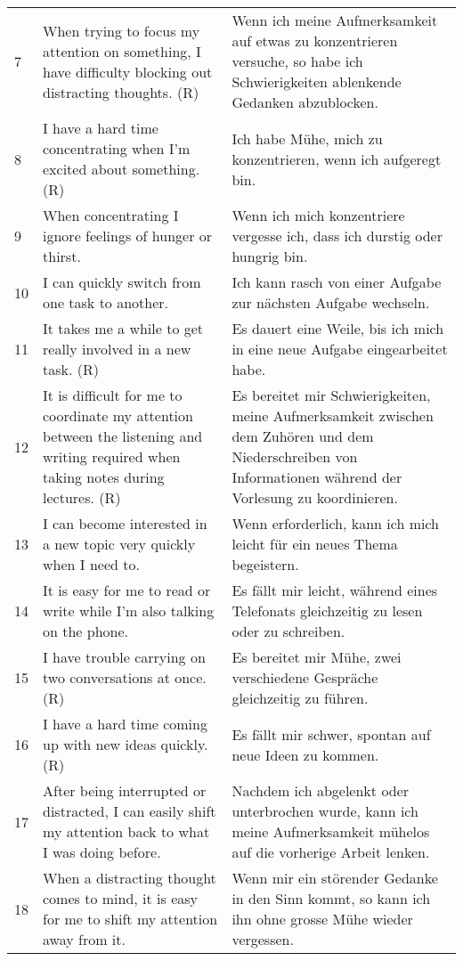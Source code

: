 \begin{RaggedRight}
\begin{center}
\begin{longtable}[t]{|l|p{6.6 cm}|p{6.6 cm}|}
        7 & When trying to focus my attention on something, I have difficulty blocking out distracting thoughts. (R) & Wenn ich meine Aufmerksamkeit auf etwas zu konzentrieren versuche, so habe ich Schwierigkeiten ablenkende Gedanken abzublocken. \\
        8 & I have a hard time concentrating when I’m excited about something. (R) & Ich habe Mühe, mich zu konzentrieren, wenn ich aufgeregt bin. \\
        9 & When concentrating I ignore feelings of hunger or thirst. & Wenn ich mich konzentriere vergesse ich, dass ich durstig oder hungrig bin. \\
        10 & I can quickly switch from one task to another. & Ich kann rasch von einer Aufgabe zur nächsten Aufgabe wechseln. \\
        11 & It takes me a while to get really involved in a new task. (R) & Es dauert eine Weile, bis ich mich in eine neue Aufgabe eingearbeitet habe. \\
        12 & It is difficult for me to coordinate my attention between the listening and writing required when taking notes during lectures. (R) & Es bereitet mir Schwierigkeiten, meine Aufmerksamkeit zwischen dem Zuhören und dem Niederschreiben von Informationen während der Vorlesung zu koordinieren. \\
        13 & I can become interested in a new topic very quickly when I need to. & Wenn erforderlich, kann ich mich leicht für ein neues Thema begeistern.  \\
        14 & It is easy for me to read or write while I’m also talking on the phone. & Es fällt mir leicht, während eines Telefonats gleichzeitig zu lesen oder zu schreiben.  \\
        15 & I have trouble carrying on two conversations at once. (R) & Es bereitet mir Mühe, zwei verschiedene Gespräche gleichzeitig zu führen. \\
        16 & I have a hard time coming up with new ideas quickly. (R) & Es fällt mir schwer, spontan auf neue Ideen zu kommen. \\
        17 & After being interrupted or distracted, I can easily shift my attention back to what I was doing before. & Nachdem ich abgelenkt oder unterbrochen wurde, kann ich meine Aufmerksamkeit mühelos auf die vorherige Arbeit lenken. \\
        18 & When a distracting thought comes to mind, it is easy for me to shift my attention away from it. & Wenn mir ein störender Gedanke in den Sinn kommt, so kann ich ihn ohne grosse Mühe wieder vergessen.  \\

\end{longtable}
\end{center}
\end{RaggedRight}
